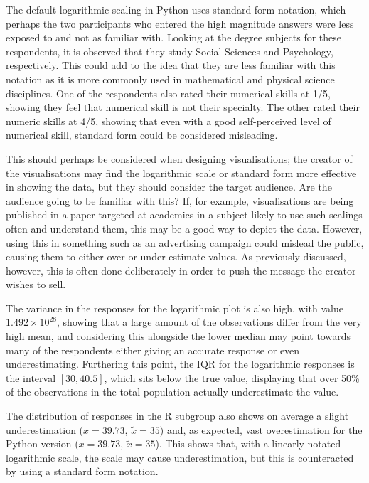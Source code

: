 \documentclass[
  11pt,
]{book}
\begin{document}
The default logarithmic scaling in Python uses standard form notation,
which perhaps the two participants who entered the high magnitude
answers were less exposed to and not as familiar with. Looking at the
degree subjects for these respondents, it is observed that they study
Social Sciences and Psychology, respectively. This could add to the idea
that they are less familiar with this notation as it is more commonly
used in mathematical and physical science disciplines. One of the
respondents also rated their numerical skills at 1/5, showing they feel
that numerical skill is not their specialty. The other rated their
numeric skills at 4/5, showing that even with a good self-perceived
level of numerical skill, standard form could be considered misleading.

This should perhaps be considered when designing visualisations; the
creator of the visualisations may find the logarithmic scale or standard
form more effective in showing the data, but they should consider the
target audience. Are the audience going to be familiar with this? If,
for example, visualisations are being published in a paper targeted at
academics in a subject likely to use such scalings often and understand
them, this may be a good way to depict the data. However, using this in
something such as an advertising campaign could mislead the public,
causing them to either over or under estimate values. As previously
discussed, however, this is often done deliberately in order to push the
message the creator wishes to sell.

The variance in the responses for the logarithmic plot is also high,
with value \(1.492 \times 10^{28}\), showing that a large amount of the
observations differ from the very high mean, and considering this
alongside the lower median may point towards many of the respondents
either giving an accurate response or even underestimating. Furthering
this point, the IQR for the logarithmic responses is the interval
\([30, 40.5]\), which sits below the true value, displaying that over
50\% of the observations in the total population actually underestimate
the value.

The distribution of responses in the R subgroup also shows on average a
slight underestimation (\(\bar{x}= 39.73\), \(\tilde{x} = 35\)) and, as
expected, vast overestimation for the Python version
(\(\bar{x}= 39.73\), \(\tilde{x} = 35\)). This shows that, with a
linearly notated logarithmic scale, the scale may cause underestimation,
but this is counteracted by using a standard form notation.
\end{document}
